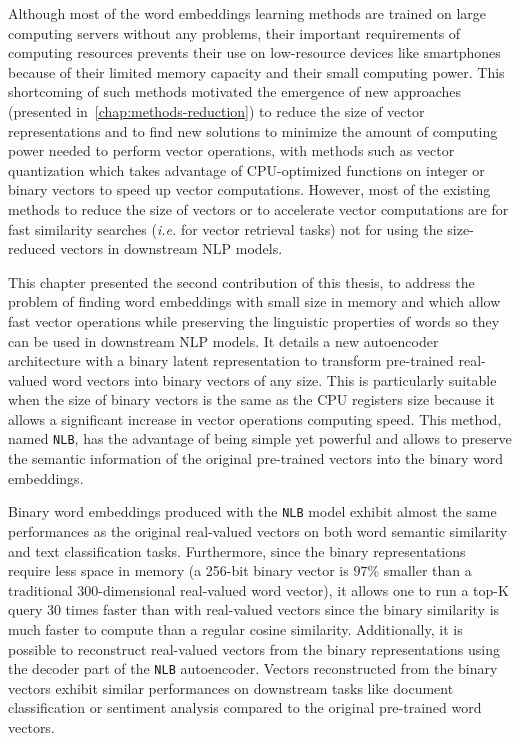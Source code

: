   Although most of the word embeddings learning methods are trained on large
  computing servers without any problems, their important requirements of
  computing resources prevents their use on low-resource devices like
  smartphones because of their limited memory capacity and their small computing
  power. This shortcoming of such methods motivated the emergence of new
  approaches (presented in~\autoref{chap:methods-reduction}) to reduce the size
  of vector representations and to find new solutions to minimize the amount of
  computing power needed to perform vector operations, with methods such as
  vector quantization which takes advantage of CPU-optimized functions on
  integer or binary vectors to speed up vector computations. However, most of
  the existing methods to reduce the size of vectors or to accelerate vector
  computations are for fast similarity searches (\textit{i.e.} for vector
  retrieval tasks) not for using the size-reduced vectors in downstream NLP
  models. \medskip

  This chapter presented the second contribution of this thesis, to address the
  problem of finding word embeddings with small size in memory and which allow
  fast vector operations while preserving the linguistic properties of words so
  they can be used in downstream NLP models. It details a new autoencoder
  architecture with a binary latent representation to transform pre-trained
  real-valued word vectors into binary vectors of any size. This is particularly
  suitable when the size of binary vectors is the same as the CPU registers size
  because it allows a significant increase in vector operations computing speed.
  This method, named \texttt{NLB}, has the advantage of being simple yet
  powerful and allows to preserve the semantic information of the original
  pre-trained vectors into the binary word embeddings.\medskip

  Binary word embeddings produced with the \texttt{NLB} model exhibit almost the
  same performances as the original real-valued vectors on both word semantic
  similarity and text classification tasks. Furthermore, since the binary
  representations require less space in memory (a 256-bit binary vector is
  $97\%$ smaller than a traditional 300-dimensional real-valued word vector), it
  allows one to run a top-K query 30 times faster than with real-valued vectors
  since the binary similarity is much faster to compute than a regular cosine
  similarity. Additionally, it is possible to reconstruct real-valued vectors
  from the binary representations using the decoder part of the \texttt{NLB}
  autoencoder. Vectors reconstructed from the binary vectors exhibit similar
  performances on downstream tasks like document classification or sentiment
  analysis compared to the original pre-trained word vectors.

